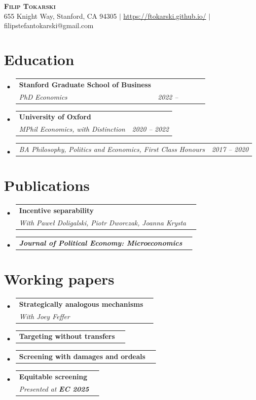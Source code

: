 \documentclass[letterpaper,11pt]{article}
\makeatletter
\newcommand{\resumeSubheading}[3]{
  \vspace{-2pt}\item
    \begin{tabular*}{0.97\textwidth}[t]{l@{\extracolsep{\fill}}r}
      \textbf{#1} \\
      \textit{\small#2} & \textit{\small #3} \\
    \end{tabular*}\vspace{-7pt}
}
\newcommand{\resumeSubSubheading}[2]{
    \item
    \begin{tabular*}{0.97\textwidth}{l@{\extracolsep{\fill}}r}
      \textit{\small#1} & \textit{\small #2} \\
    \end{tabular*}\vspace{-7pt}
}
\newcommand{\resumeProjectHeading}[2]{
    \item
    \begin{tabular*}{0.97\textwidth}{l@{\extracolsep{\fill}}r}
      \small#1\\
    \end{tabular*}\vspace{-7pt}
}
\newcommand{\resumeSubHeadingListStart}{\begin{itemize}[leftmargin=0.15in, label={}]}
\newcommand{\resumeSubHeadingListEnd}{\end{itemize}}
\makeatother
\begin{document}
\begin{center}
    \textbf{\Huge \scshape Filip Tokarski} \\ \vspace{1pt}
    \small 655 Knight Way, Stanford, CA 94305 $|$
    \small \url{https://ftokarski.github.io/} $|$
    \small filipstefantokarski@gmail.com %
\end{center}



\section{Education}
  \resumeSubHeadingListStart
    \resumeSubheading
      {Stanford Graduate School of Business}
      {PhD Economics}{2022 -- \ \ \ \ \ \ }
    \resumeSubHeadingListEnd
  \resumeSubHeadingListStart
    \resumeSubheading
      {University of Oxford}
      {MPhil Economics, with Distinction}{2020 -- 2022}
        \resumeSubSubheading
  {BA Philosophy, Politics and Economics, First Class Honours}{2017 -- 2020}
  \resumeSubHeadingListEnd

\vspace{0.15cm}

\section{Publications}
  \resumeSubHeadingListStart
  \resumeSubheading
      {Incentive separability}
      {With Pawe\l{} Doligalski, Piotr Dworczak, Joanna Krysta}{}
      \vspace*{-0.25cm}
      \resumeSubSubheading
      {\textbf{Journal of Political Economy: Microeconomics}}{}
  \resumeSubHeadingListEnd

\vspace{0.15cm}

\section{Working papers}
\resumeSubHeadingListStart
  \resumeSubheading
    {Strategically analogous mechanisms}
    {With Joey Feffer}{}\vspace{0.1cm}
  \resumeProjectHeading{\textbf{Targeting without transfers}}{} \vspace{-0.2cm}
  \resumeProjectHeading{\textbf{Screening with damages and ordeals}}{} \vspace{-0.2cm}
  \resumeSubheading
    {Equitable screening}
    {Presented at \textbf{EC 2025}}{}
\resumeSubHeadingListEnd
\end{document}
